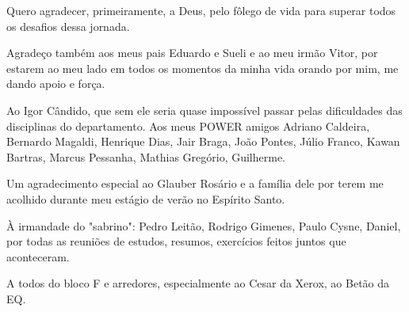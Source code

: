 \begin{agradecimentos}

Quero agradecer, primeiramente, a Deus, pelo fôlego de vida para superar todos os desafios dessa jornada.

Agradeço também aos meus pais Eduardo e Sueli e ao meu irmão Vitor, por estarem ao meu lado em todos os momentos da minha vida orando por mim, me dando apoio e força.

Ao Igor Cândido, que sem ele seria quase impossível passar pelas dificuldades das disciplinas do departamento. Aos meus POWER amigos Adriano Caldeira,  Bernardo Magaldi, Henrique Dias, Jair Braga, João Pontes, Júlio Franco,  Kawan Bartras, Marcus Pessanha, Mathias Gregório, Guilherme. 

Um agradecimento especial ao Glauber Rosário e a família dele por terem me acolhido durante meu estágio de verão no Espírito Santo.

À irmandade do "sabrino": Pedro Leitão, Rodrigo Gimenes, Paulo Cysne, Daniel, por todas as reuniões de estudos, resumos, exercícios feitos juntos que aconteceram. 

A todos do bloco F e arredores, especialmente ao Cesar da Xerox, ao Betão da EQ.


\end{agradecimentos}